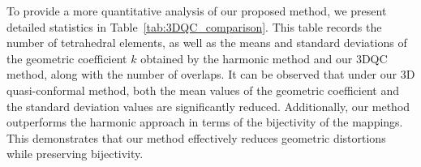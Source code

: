 \documentclass{article}
\begin{document}

    

To provide a more quantitative analysis of our proposed method, we present detailed statistics in Table~\ref{tab:3DQC_comparison}. This table records the number of tetrahedral elements, as well as the means and standard deviations of the geometric coefficient $k$ obtained by the harmonic method and our 3DQC method, along with the number of overlaps. It can be observed that under our 3D quasi-conformal method,  both the mean values of the geometric coefficient and the standard deviation values are significantly reduced. Additionally, our method outperforms the harmonic approach in terms of the bijectivity of the mappings. This demonstrates that our method effectively reduces geometric distortions while preserving bijectivity.
\end{document}

